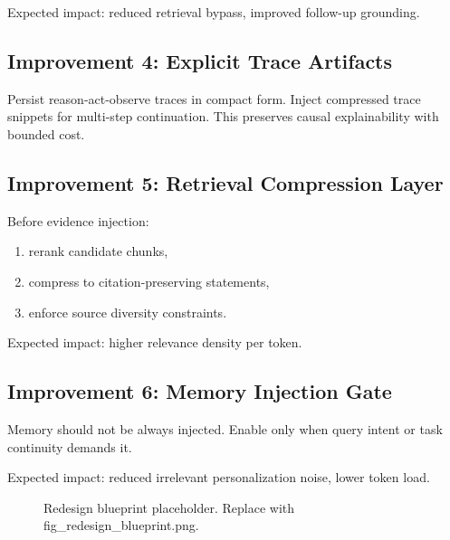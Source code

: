 \documentclass[conference]{IEEEtran}
\begin{document}
Expected impact:
reduced retrieval bypass,
improved follow-up grounding.

\subsection{Improvement 4: Explicit Trace Artifacts}

Persist reason-act-observe traces in compact form.
Inject compressed trace snippets for multi-step continuation.
This preserves causal explainability with bounded cost.

\subsection{Improvement 5: Retrieval Compression Layer}

Before evidence injection:

\begin{enumerate}[leftmargin=1.2em]
\item rerank candidate chunks,
\item compress to citation-preserving statements,
\item enforce source diversity constraints.
\end{enumerate}

Expected impact:
higher relevance density per token.

\subsection{Improvement 6: Memory Injection Gate}

Memory should not be always injected.
Enable only when query intent or task continuity demands it.

Expected impact:
reduced irrelevant personalization noise,
lower token load.

\begin{figure}[H]
\centering
{}
\caption{Redesign blueprint placeholder. Replace with fig\_redesign\_blueprint.png.}
\label{fig:redesign_blueprint}
\end{figure}
\end{document}
